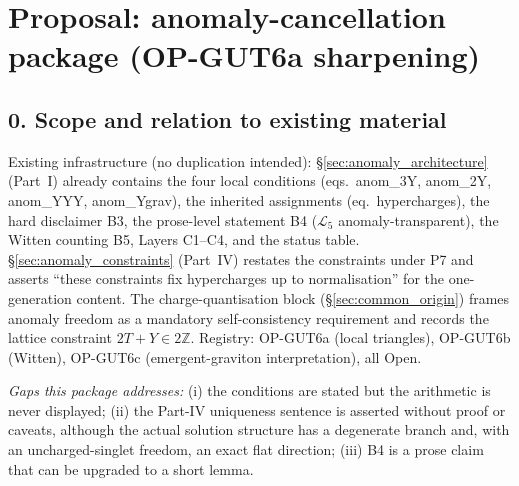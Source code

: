\section*{Proposal: anomaly-cancellation package (OP-GUT6a sharpening)}

\subsection*{0. Scope and relation to existing material}
Existing infrastructure (no duplication intended):
\S\ref{sec:anomaly_architecture} (Part~I) already contains the four
local conditions (eqs.~anom\_3Y, anom\_2Y, anom\_YYY, anom\_Ygrav),
the inherited assignments (eq.~hypercharges), the hard disclaimer B3,
the prose-level statement B4 ($\mathcal L_5$ anomaly-transparent),
the Witten counting B5, Layers C1--C4, and the status table.
\S\ref{sec:anomaly_constraints} (Part~IV) restates the constraints
under P7 and asserts ``these constraints fix hypercharges up to
normalisation'' for the one-generation content.
The charge-quantisation block (\S\ref{sec:common_origin}) frames
anomaly freedom as a mandatory self-consistency requirement and
records the lattice constraint $2T+Y\in2\mathbb Z$.
Registry: OP-GUT6a (local triangles), OP-GUT6b (Witten),
OP-GUT6c (emergent-graviton interpretation), all Open.

\emph{Gaps this package addresses:}
(i) the conditions are stated but the arithmetic is never displayed;
(ii) the Part-IV uniqueness sentence is asserted without proof or
caveats, although the actual solution structure has a degenerate
branch and, with an uncharged-singlet freedom, an exact flat
direction;
(iii) B4 is a prose claim that can be upgraded to a short lemma.

